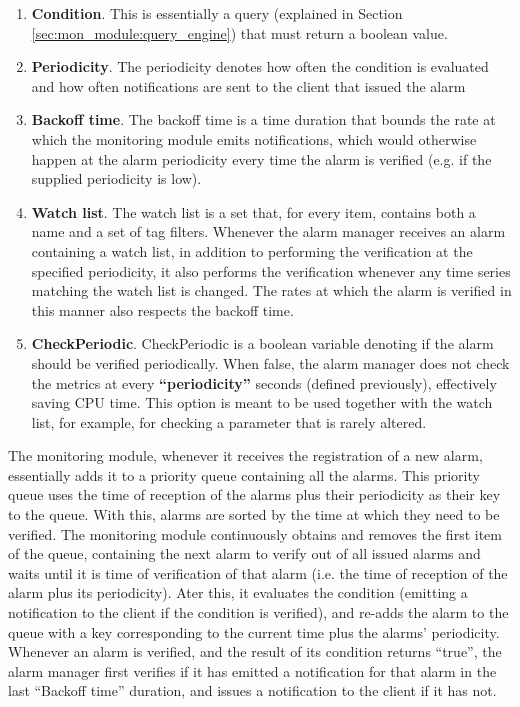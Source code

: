 \begin{enumerate}
    \item \textbf{Condition}. This is essentially a query (explained in Section \ref{sec:mon_module:query_engine}) that must return a boolean value.
    
    \item \textbf{Periodicity}. The periodicity denotes how often the condition is evaluated and how often notifications are sent to the client that issued the alarm
    
    \item \textbf{Backoff time}. The backoff time is a time duration that bounds the rate at which the monitoring module emits notifications, which would otherwise happen at the alarm periodicity every time the alarm is verified (e.g. if the supplied periodicity is low).
    
    \item \textbf{Watch list}. The watch list is a set that, for every item, contains both a name and a set of tag filters. Whenever the alarm manager receives an alarm containing a watch list, in addition to performing the verification at the specified periodicity, it also performs the verification whenever any time series matching the watch list is changed. The rates at which the alarm is verified in this manner also respects the backoff time.
    
    \item \textbf{CheckPeriodic}. CheckPeriodic is a boolean variable denoting if the alarm should be verified periodically. When false, the alarm manager does not check the metrics at every \textbf{``periodicity''} seconds (defined previously), effectively saving CPU time. This option is meant to be used together with the watch list, for example, for checking a parameter that is rarely altered.
    
\end{enumerate}

The monitoring module, whenever it receives the registration of a new alarm, essentially adds it to a priority queue containing all the alarms. This priority queue uses the time of reception of the alarms plus their periodicity as their key to the queue. With this, alarms are sorted by the time at which they need to be verified. The monitoring module continuously obtains and removes the first item of the queue, containing the next alarm to verify out of all issued alarms and waits until it is time of verification of that alarm (i.e. the time of reception of the alarm plus its periodicity). Ater this, it evaluates the condition (emitting a notification to the client if the condition is verified), and re-adds the alarm to the queue with a key corresponding to the current time plus the alarms' periodicity. Whenever an alarm is verified, and the result of its condition returns ``true'', the alarm manager first verifies if it has emitted a notification for that alarm in the last ``Backoff time'' duration, and issues a notification to the client if it has not.